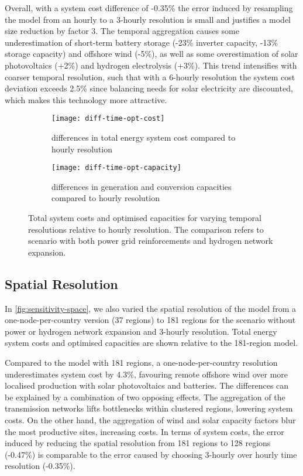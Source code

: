 Overall, with a system cost difference of -0.35\% the error induced by
resampling the model from an hourly to a 3-hourly resolution is small and
justifies a model size reduction by factor 3. The temporal aggregation causes
some underestimation of short-term battery storage (-23\% inverter capacity,
-13\% storage capacity) and offshore wind (-5\%), as well as some overestimation
of solar photovoltaics (+2\%) and hydrogen electrolysis (+3\%). This trend
intensifies with coarser temporal resolution, such that with a 6-hourly
resolution the system cost deviation exceeds 2.5\% since balancing needs for
solar electricity are discounted, which makes this technology more attractive.

\begin{figure}
    \centering
    \begin{subfigure}[t]{\textwidth}
        \centering
        \caption{differences in total energy system cost compared to hourly resolution}
        \texttt{[image: diff-time-opt-cost]}
        \label{fig:sensitivity-time-cost}
    \end{subfigure}
    \begin{subfigure}[t]{\textwidth}
        \centering
        \caption{differences in generation and conversion capacities compared to hourly resolution}
        \texttt{[image: diff-time-opt-capacity]}
        \label{fig:sensitivity-time-cap}
    \end{subfigure}
    \caption{ Total system costs and optimised capacities for varying temporal
    resolutions relative to hourly resolution. The comparison refers to scenario
    with both power grid reinforcements and hydrogen network expansion. }
    \label{fig:sensitivity-time}
\end{figure}

\subsection{Spatial Resolution}
\label{sec:si:sensitivity-space}

In \cref{fig:sensitivity-space}, we also varied the spatial resolution of the
model from a one-node-per-country version (37 regions) to 181 regions for the
scenario without power or hydrogen network expansion and 3-hourly resolution.
Total energy system costs and optimised capacities are shown relative to the
181-region model.

Compared to the model with 181 regions, a one-node-per-country resolution
underestimates system cost by 4.3\%, favouring remote offshore wind over more
localised production with solar photovoltaics and batteries. The differences can
be explained by a combination of two opposing
effects. The aggregation of the transmission
networks lifts bottlenecks within clustered regions, lowering system costs. On
the other hand, the aggregation of wind and solar capacity factors blur the most
productive sites, increasing costs. In terms of system costs, the error induced
by reducing the spatial resolution from 181 regions to 128 regions (-0.47\%) is
comparable to the error caused by choosing 3-hourly over hourly time resolution
(-0.35\%).

